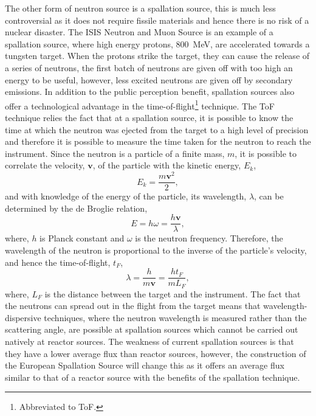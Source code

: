 The other form of neutron source is a spallation source, this is much less controversial as it does not require fissile materials and hence there is no risk of a nuclear disaster.
The ISIS Neutron and Muon Source is an example of a spallation source, where high energy protons, \SI{800}{\mega\eV}, are accelerated towards a tungsten target.
When the protons strike the target, they can cause the release of a series of neutrons, the first batch of neutrons are given off with too high an energy to be useful, however, less excited neutrons are given off by secondary emissions.
In addition to the public perception benefit, spallation sources also offer a technological advantage in the time-of-flight\footnote{Abbreviated to ToF.} technique.
The ToF technique relies the fact that at a spallation source, it is possible to know the time at which the neutron was ejected from the target to a high level of precision and therefore it is possible to measure the time taken for the neutron to reach the instrument.
Since the neutron is a particle of a finite mass, $m$, it is possible to correlate the velocity, $\mathbf{v}$, of the particle with the kinetic energy, $E_k$,
%
\begin{equation}
    E_k = \frac{m\mathbf{v}^2}{2},
\end{equation}
%
and with knowledge of the energy of the particle, its wavelength, $\lambda$, can be determined by the de Broglie relation,
%
\begin{equation}
    E = h\omega = \frac{h\mathbf{v}}{\lambda},
\end{equation}
%
where, $h$ is Planck constant and $\omega$ is the neutron frequency.
Therefore, the wavelength of the neutron is proportional to the inverse of the particle's velocity, and hence the time-of-flight, $t_F$,
%
\begin{equation}
    \lambda = \frac{h}{m\mathbf{v}} = \frac{ht_F}{mL_F},
\end{equation}
%
where, $L_F$ is the distance between the target and the instrument.
The fact that the neutrons can spread out in the flight from the target means that wavelength-dispersive techniques, where the neutron wavelength is measured rather than the scattering angle, are possible at spallation sources which cannot be carried out natively at reactor sources.
The weakness of current spallation sources is that they have a lower average flux than reactor sources, however, the construction of the European Spallation Source will change this as it offers an average flux similar to that of a reactor source with the benefits of the spallation technique.

